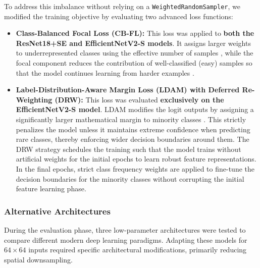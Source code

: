 To address this imbalance without relying on a \texttt{WeightedRandomSampler}, we modified the training objective by evaluating two advanced loss functions:

\begin{itemize}
    \item \textbf{Class-Balanced Focal Loss (CB-FL):} This loss was applied to \textbf{both the ResNet18+SE and EfficientNetV2-S models}. It assigns larger weights to underrepresented classes using the effective number of samples \cite{cui2019classbalancedlossbasedeffective}, while the focal component reduces the contribution of well-classified (easy) samples so that the model continues learning from harder examples \cite{lin2018focallossdenseobject}.
    \item \textbf{Label-Distribution-Aware Margin Loss (LDAM) with Deferred Re-Weighting (DRW):} This loss was evaluated \textbf{exclusively on the EfficientNetV2-S model}. LDAM modifies the logit outputs by assigning a significantly larger mathematical margin to minority classes \cite{cao2019learning}. This strictly penalizes the model unless it maintains extreme confidence when predicting rare classes, thereby enforcing wider decision boundaries around them. The DRW strategy schedules the training such that the model trains without artificial weights for the initial epochs to learn robust feature representations. In the final epochs, strict class frequency weights are applied to fine-tune the decision boundaries for the minority classes without corrupting the initial feature learning phase.
\end{itemize}

\subsubsection{Alternative Architectures}
During the evaluation phase, three low-parameter architectures were tested to compare different modern deep learning paradigms. Adapting these models for $64 \times 64$ inputs required specific architectural modifications, primarily reducing spatial downsampling.

